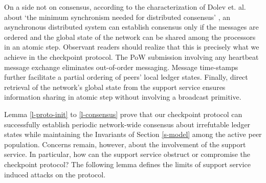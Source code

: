 On a side not on consensus, according to the characterization of Dolev et. al. about `the minimum synchronism needed for distributed consensus' \cite{Dolev:1987:MSN:7531.7533}, an asynchronous distributed system can establish consensus only if the messages are ordered and the global state of the network can be shared among the processors in an atomic step. Observant readers should realize that this is precisely what we achieve in the checkpoint protocol. The PoW submission involving any heartbeat message exchange eliminates out-of-order messaging. Message time-stamps further facilitate a partial ordering of peers' local ledger states. Finally, direct retrieval of the network's global state  from the support service ensures information sharing in atomic step without involving a broadcast primitive.

Lemma \ref{l-proto-init} to \ref{l-consensus} prove that our checkpoint protocol can successfully establish periodic network-wide consensus about irrefutable ledger states while maintaining the Invariants of Section \ref{s-model} among the active peer population. Concerns remain, however, about the involvement of the support service. In particular, how can the support service obstruct or compromise the checkpoint protocol? The following lemma defines the limits of support service induced attacks on the protocol.

